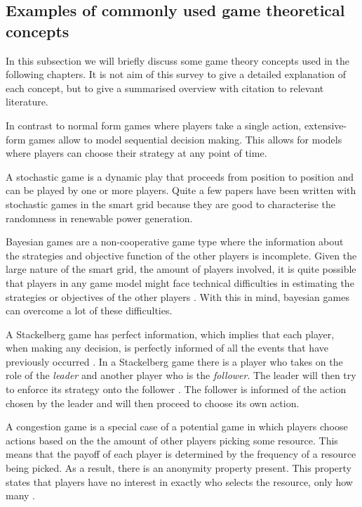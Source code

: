 \subsection{Examples of commonly used game theoretical concepts}
In this subsection we will briefly discuss some game theory concepts used in the following chapters. It is not aim of this survey to give a detailed explanation of each concept, but to give a summarised overview with citation to relevant literature.

In contrast to normal form games where players take a single action, extensive-form games allow to model sequential decision making. This allows for models where players can choose their strategy at any point of time.

A stochastic game is a dynamic play that proceeds from position to position \cite{Shapley1953} and can be played by one or more players. Quite a few papers have been written with stochastic games in the smart grid \cite{LiangZhuang2014} because they are good to characterise the randomness in renewable power generation.  

Bayesian games are a non-cooperative game type where the information about the strategies and objective function of the other players is incomplete. Given the large nature of the smart grid, the amount of players involved, it is quite possible that players in any game model might face technical difficulties in estimating the strategies or objectives of the other players \cite{keypaper}. With this in mind, bayesian games can overcome a lot of these difficulties.

A Stackelberg game has perfect information, which implies that each player, when making any decision, is perfectly informed of all the events that have previously occurred \cite{CourseInGameTheory}.
In a Stackelberg game there is a player who takes on the role of the \textit{leader} and another player who is the \textit{follower}. The leader will then try to enforce its strategy onto the follower \cite{ShohamLeyton-Brown2008}. The follower is informed of the action chosen by the leader and will then proceed to choose its own action. 

A congestion game is a special case of a potential game \cite{IbarsNavarroGiupponi2010, MondererShapley1996, ShohamLeyton-Brown2008} in which players choose actions based on the the amount of other players picking some resource. This means that the payoff of each player is determined by the frequency of a resource being picked. As a result, there is an anonymity property present. This property states that players have no interest in exactly who selects the resource, only how many \cite{ShohamLeyton-Brown2008}.

